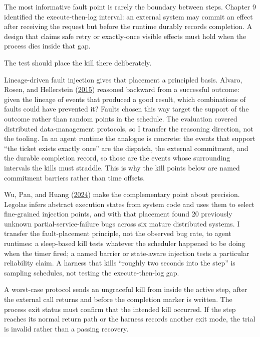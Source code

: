 The most informative fault point is rarely the boundary between steps. Chapter 9 identified the execute-then-log interval: an external system may commit an effect after receiving the request but before the runtime durably records completion. A design that claims safe retry or exactly-once visible effects must hold when the process dies inside that gap.

The test should place the kill there deliberately.

Lineage-driven fault injection gives that placement a principled basis. Alvaro, Rosen, and Hellerstein (\href{https://dl.acm.org/doi/10.1145/2723372.2723711}{2015}) reasoned backward from a successful outcome: given the lineage of events that produced a good result, which combinations of faults could have prevented it? Faults chosen this way target the support of the outcome rather than random points in the schedule. The evaluation covered distributed data-management protocols, so I transfer the reasoning direction, not the tooling. In an agent runtime the analogue is concrete: the events that support ``the ticket exists exactly once'' are the dispatch, the external commitment, and the durable completion record, so those are the events whose surrounding intervals the kills must straddle. This is why the kill points below are named commitment barriers rather than time offsets.

Wu, Pan, and Huang (\href{https://www.usenix.org/conference/nsdi24/presentation/wu-haoze}{2024}) make the complementary point about precision. Legolas infers abstract execution states from system code and uses them to select fine-grained injection points, and with that placement found 20 previously unknown partial-service-failure bugs across six mature distributed systems. I transfer the fault-placement principle, not the observed bug rate, to agent runtimes: a sleep-based kill tests whatever the scheduler happened to be doing when the timer fired; a named barrier or state-aware injection tests a particular reliability claim. A harness that kills ``roughly two seconds into the step'' is sampling schedules, not testing the execute-then-log gap.

A worst-case protocol sends an ungraceful kill from inside the active step, after the external call returns and before the completion marker is written. The process exit status must confirm that the intended kill occurred. If the step reaches its normal return path or the harness records another exit mode, the trial is invalid rather than a passing recovery.

